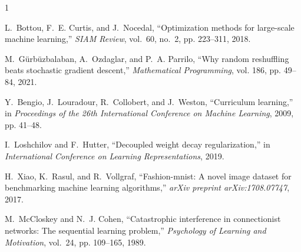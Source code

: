 \documentclass[conference]{IEEEtran}
\begin{document}
\begin{thebibliography}{1}
\providecommand{\newblock}{\relax}

L.~Bottou, F.~E. Curtis, and J.~Nocedal, ``Optimization methods for large-scale
  machine learning,'' \emph{SIAM Review}, vol.~60, no.~2, pp. 223--311, 2018.

M.~G{\"u}rb{\"u}zbalaban, A.~Ozdaglar, and P.~A. Parrilo, ``Why random
  reshuffling beats stochastic gradient descent,'' \emph{Mathematical
  Programming}, vol. 186, pp. 49--84, 2021.

Y.~Bengio, J.~Louradour, R.~Collobert, and J.~Weston, ``Curriculum learning,''
  in \emph{Proceedings of the 26th International Conference on Machine
  Learning}, 2009, pp. 41--48.

I.~Loshchilov and F.~Hutter, ``Decoupled weight decay regularization,'' in
  \emph{International Conference on Learning Representations}, 2019.

H.~Xiao, K.~Rasul, and R.~Vollgraf, ``Fashion-mnist: A novel image dataset for
  benchmarking machine learning algorithms,'' \emph{arXiv preprint
  arXiv:1708.07747}, 2017.

M.~McCloskey and N.~J. Cohen, ``Catastrophic interference in connectionist
  networks: The sequential learning problem,'' \emph{Psychology of Learning and
  Motivation}, vol.~24, pp. 109--165, 1989.

\end{thebibliography}
\end{document}
